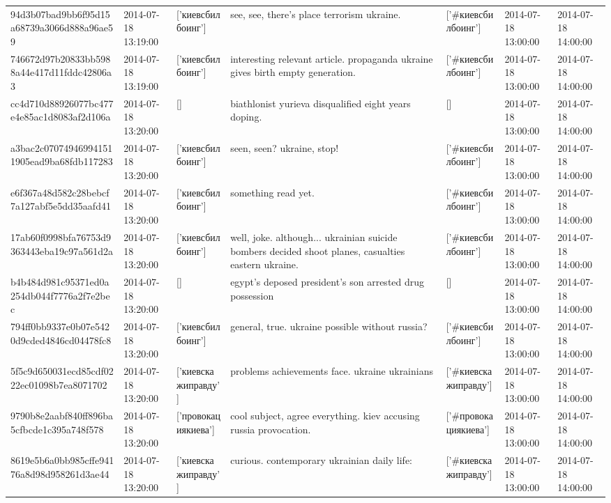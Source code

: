 \begin{tabular}{lllllll}
94d3b07bad9bb6f95d15a68739a3066d888a96ae59 & 2014-07-18 13:19:00 & ['киевсбилбоинг'] & see, see, there's place terrorism ukraine. & ['#киевсбилбоинг'] & 2014-07-18 13:00:00 & 2014-07-18 14:00:00 \\
746672d97b20833bb5988a44e417d11fddc42806a3 & 2014-07-18 13:19:00 & ['киевсбилбоинг'] & interesting relevant article. propaganda ukraine gives birth empty generation. & ['#киевсбилбоинг'] & 2014-07-18 13:00:00 & 2014-07-18 14:00:00 \\
cc4d710d88926077bc477e4e85ac1d8083af2d106a & 2014-07-18 13:20:00 & [] & biathlonist yurieva disqualified eight years doping. & [] & 2014-07-18 13:00:00 & 2014-07-18 14:00:00 \\
a3bac2c070749469941511905ead9ba68fdb117283 & 2014-07-18 13:20:00 & ['киевсбилбоинг'] & seen, seen? ukraine, stop! & ['#киевсбилбоинг'] & 2014-07-18 13:00:00 & 2014-07-18 14:00:00 \\
e6f367a48d582c28bebcf7a127abf5e5dd35aafd41 & 2014-07-18 13:20:00 & ['киевсбилбоинг'] & something read yet. & ['#киевсбилбоинг'] & 2014-07-18 13:00:00 & 2014-07-18 14:00:00 \\
17ab60f0998bfa76753d9363443eba19c97a561d2a & 2014-07-18 13:20:00 & ['киевсбилбоинг'] & well, joke. although... ukrainian suicide bombers decided shoot planes, casualties eastern ukraine. & ['#киевсбилбоинг'] & 2014-07-18 13:00:00 & 2014-07-18 14:00:00 \\
b4b484d981c95371ed0a254db044f7776a2f7e2bec & 2014-07-18 13:20:00 & [] & egypt's deposed president's son arrested drug possession & [] & 2014-07-18 13:00:00 & 2014-07-18 14:00:00 \\
794ff0bb9337e0b07e5420d9cded4846cd04478fc8 & 2014-07-18 13:20:00 & ['киевсбилбоинг'] & general, true. ukraine possible without russia? & ['#киевсбилбоинг'] & 2014-07-18 13:00:00 & 2014-07-18 14:00:00 \\
5f5c9d650031ecd85cdf0222ec01098b7ea8071702 & 2014-07-18 13:20:00 & ['киевскажиправду'] & problems achievements face. ukraine ukrainians & ['#киевскажиправду'] & 2014-07-18 13:00:00 & 2014-07-18 14:00:00 \\
9790b8e2aabf840ff896ba5cfbcde1c395a748f578 & 2014-07-18 13:20:00 & ['провокациякиева'] & cool subject, agree everything. kiev accusing russia provocation. & ['#провокациякиева'] & 2014-07-18 13:00:00 & 2014-07-18 14:00:00 \\
8619e5b6a0bb985cffe94176a8d98d958261d3ae44 & 2014-07-18 13:20:00 & ['киевскажиправду'] & curious. contemporary ukrainian daily life: & ['#киевскажиправду'] & 2014-07-18 13:00:00 & 2014-07-18 14:00:00 \\

\end{tabular}
